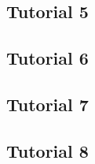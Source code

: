 \subsection*{Tutorial 5}
\subsection*{Tutorial 6}
\subsection*{Tutorial 7}
\subsection*{Tutorial 8}









